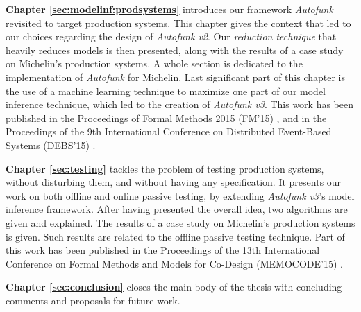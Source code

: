 \textbf{Chapter \ref{sec:modelinf:prodsystems}} introduces our
framework \textit{Autofunk} revisited to target production
systems. This chapter gives the context that led to our choices
regarding the design of \textit{Autofunk v2}. Our \emph{reduction
technique} that heavily reduces models is then presented, along
with the results of a case study on Michelin's production
systems. A whole section is dedicated to the implementation of
\textit{Autofunk} for Michelin. Last significant part of this
chapter is the use of a machine learning technique to maximize
one part of our model inference technique, which led to the
creation of \emph{Autofunk v3}. This work has been published in
the Proceedings of Formal Methods 2015 (FM'15)
\cite{DBLP:conf/fm/DurandS15}, and in the Proceedings of the 9th
International Conference on Distributed Event-Based Systems
(DEBS'15) \cite{DBLP:conf/debs/SalvaD15}.

\textbf{Chapter \ref{sec:testing}} tackles the problem of testing
production systems, without disturbing them, and without having
any specification. It presents our work on both offline and
online passive testing, by extending \textit{Autofunk v3}'s model
inference framework. After having presented the overall idea, two
algorithms are given and explained. The results of a case study
on Michelin's production systems is given. Such results are
related to the offline passive testing technique. Part of this
work has been published in the Proceedings of the 13th
International Conference on Formal Methods and Models for
Co-Design (MEMOCODE'15) \cite{7340480}.

\textbf{Chapter \ref{sec:conclusion}} closes the main body of the
thesis with concluding comments and proposals for future work.

\cleardoublepage
\blankpage
